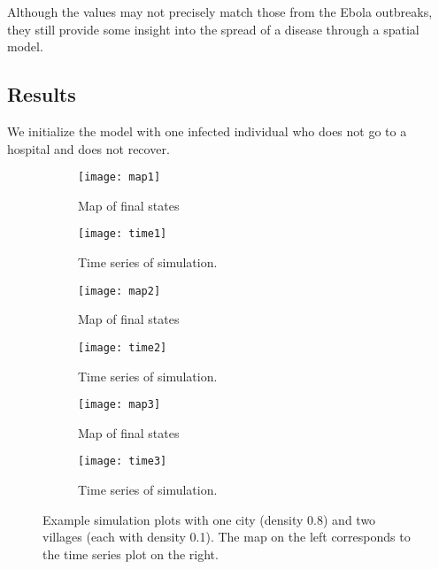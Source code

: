 Although the values may not precisely match those from the Ebola outbreaks, they still provide some insight into the spread of a disease through a spatial model.


\subsection{Results}

We initialize the model with one infected individual who does not go to a hospital and does not recover. 

\begin{figure}
\centering
\begin{subfigure}[t]{0.38\textwidth}
  \texttt{[image: map1]} 
  \caption{Map of final states}
\end{subfigure}
\begin{subfigure}[t]{0.56\textwidth}
  \texttt{[image: time1]}
  \caption{Time series of simulation.}
\end{subfigure}
\begin{subfigure}[t]{0.38\textwidth}
  \texttt{[image: map2]} 
  \caption{Map of final states}
\end{subfigure}
\begin{subfigure}[t]{0.56\textwidth}
  \texttt{[image: time2]}
  \caption{Time series of simulation.}
\end{subfigure}
\begin{subfigure}[t]{0.38\textwidth}
  \texttt{[image: map3]} 
  \caption{Map of final states}
\end{subfigure}
\begin{subfigure}[t]{0.56\textwidth}
  \texttt{[image: time3]}
  \caption{Time series of simulation.}
\end{subfigure}
\caption{Example simulation plots with one city (density 0.8) and two villages (each with density 0.1). The map on the left corresponds to the time series plot on the right.}
\end{figure}
